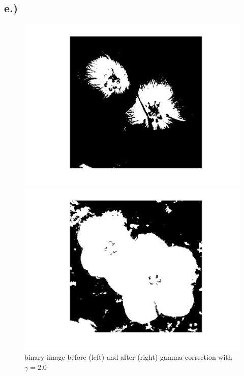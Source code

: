 \documentclass{scrartcl}
\begin{document}
\subsection*{e.)}

%

\begin{figure}[htp!]
	\begin{minipage}[t]{0.5\textwidth}
		\includegraphics[width=\textwidth]{flower_bin1.png}
	\end{minipage}
	\begin{minipage}[t]{0.5\textwidth}
		\includegraphics[width=\textwidth]{flower_bin2.png}
	\end{minipage}
	\caption{binary image before (left) and after (right) gamma correction with  $ \gamma = 2.0 $}
\end{figure}
\end{document}
